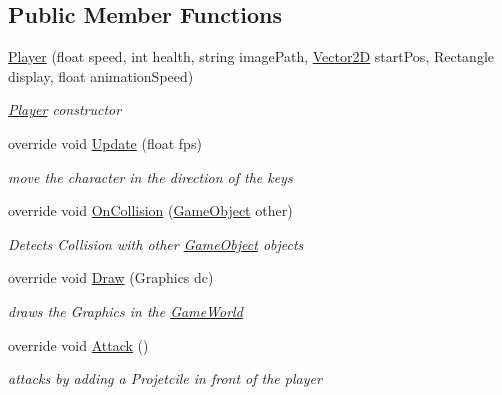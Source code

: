 \subsection*{Public Member Functions}
\begin{DoxyCompactItemize}
\item 
\hyperlink{class_mage_twinstick_1_1_player_ab0f3c00d033f0f20e743c04ae0eb6b11}{Player} (float speed, int health, string image\+Path, \hyperlink{class_mage_twinstick_1_1_vector2_d}{Vector2\+D} start\+Pos, Rectangle display, float animation\+Speed)
\begin{DoxyCompactList}\small\item\em \hyperlink{class_mage_twinstick_1_1_player}{Player} constructor \end{DoxyCompactList}\item 
override void \hyperlink{class_mage_twinstick_1_1_player_a5324e0350784da0f66369ec5ef52516a}{Update} (float fps)
\begin{DoxyCompactList}\small\item\em move the character in the direction of the keys \end{DoxyCompactList}\item 
override void \hyperlink{class_mage_twinstick_1_1_player_adb9172ee6c160eb686076749d29be061}{On\+Collision} (\hyperlink{class_mage_twinstick_1_1_game_object}{Game\+Object} other)
\begin{DoxyCompactList}\small\item\em Detects Collision with other \hyperlink{class_mage_twinstick_1_1_game_object}{Game\+Object} objects \end{DoxyCompactList}\item 
override void \hyperlink{class_mage_twinstick_1_1_player_a2ccf76e50c0e5fa6642da04a4a5c4fa8}{Draw} (Graphics dc)
\begin{DoxyCompactList}\small\item\em draws the Graphics in the \hyperlink{class_mage_twinstick_1_1_game_world}{Game\+World} \end{DoxyCompactList}\item 
override void \hyperlink{class_mage_twinstick_1_1_player_a418c80bddb416cd2cdd180ab21831f57}{Attack} ()
\begin{DoxyCompactList}\small\item\em attacks by adding a Projetcile in front of the player \end{DoxyCompactList}\end{DoxyCompactItemize}
